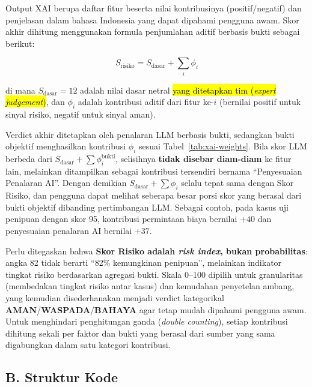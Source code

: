\documentclass[12pt,a4paper]{article}
\newcommand{\revisi}[1]{\hl{#1}}
\newenvironment{sorotkuning}{%
  \begin{tcolorbox}[
    breakable,
    enhanced,
    frame hidden,
    boxrule=0pt,
    arc=0mm,
    sharp corners,
    colback=yellow!22,
    left=1.5mm, right=1.5mm, top=1.0mm, bottom=1.0mm,
    before skip=1.5pt, after skip=1.5pt
  ]%
}{%
  \end{tcolorbox}%
}
\begin{document}
\begin{sorotkuning}
Output XAI berupa daftar fitur beserta nilai kontribusinya (positif/negatif) dan penjelasan
dalam bahasa Indonesia yang dapat dipahami pengguna awam. Skor akhir dihitung menggunakan
formula penjumlahan aditif berbasis bukti sebagai berikut:

\begin{equation}
S_{\text{risiko}} = S_{\text{dasar}} + \sum_{i} \phi_i
\end{equation}

\noindent di mana $S_{\text{dasar}} = 12$ adalah nilai dasar netral \revisi{yang ditetapkan tim (\textit{expert judgement})}, dan $\phi_i$ adalah kontribusi aditif dari fitur ke-$i$
(bernilai positif untuk sinyal risiko, negatif untuk sinyal aman).
\begin{sorotkuning}
Verdict akhir ditetapkan oleh penalaran LLM berbasis bukti, sedangkan bukti objektif menghasilkan kontribusi
$\phi_i$ sesuai Tabel~\ref{tab:xai-weights}. Bila skor LLM berbeda dari $S_{\text{dasar}} + \sum \phi_i^{\text{bukti}}$,
selisihnya \textbf{tidak disebar diam-diam} ke fitur lain, melainkan ditampilkan sebagai kontribusi tersendiri bernama
``Penyesuaian Penalaran AI''. Dengan demikian $S_{\text{dasar}} + \sum \phi_i$ selalu tepat sama dengan Skor Risiko,
dan pengguna dapat melihat seberapa besar porsi skor yang berasal dari bukti objektif dibanding pertimbangan LLM.
Sebagai contoh, pada kasus uji penipuan dengan skor 95, kontribusi permintaan biaya bernilai $+40$ dan penyesuaian
penalaran AI bernilai $+37$.
\end{sorotkuning} Perlu ditegaskan bahwa \textbf{Skor Risiko adalah \textit{risk index}, bukan
probabilitas}: angka 82 tidak berarti ``82\% kemungkinan penipuan'', melainkan indikator tingkat
risiko berdasarkan agregasi bukti. Skala 0--100 dipilih untuk granularitas (membedakan tingkat
risiko antar kasus) dan kemudahan penyetelan ambang, yang kemudian disederhanakan menjadi verdict
kategorikal \textbf{AMAN}/\textbf{WASPADA}/\textbf{BAHAYA} agar tetap mudah dipahami pengguna awam. Untuk menghindari
penghitungan ganda (\textit{double counting}), setiap kontribusi dihitung sekali per faktor dan
bukti yang berasal dari sumber yang sama digabungkan dalam satu kategori kontribusi.
\end{sorotkuning}

\subsection*{B. Struktur Kode}
\end{document}
